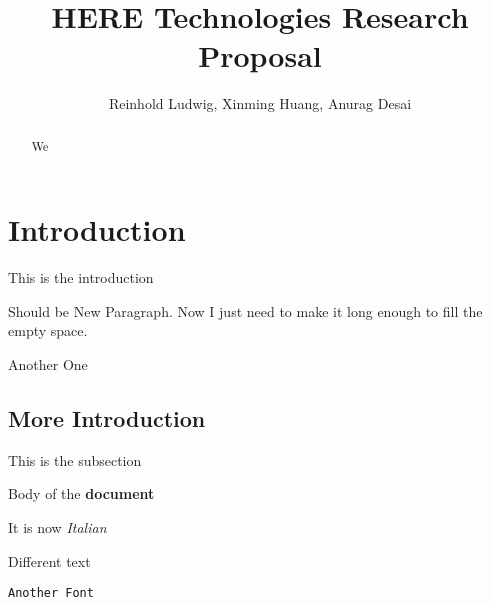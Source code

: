 \documentclass{article}
\begin{document}
	\title{HERE Technologies Research Proposal}
	\author{Reinhold Ludwig, Xinming Huang, Anurag Desai}
	\maketitle
	\begin{abstract}
		We
	\end{abstract}
	\section{Introduction}
	This is the introduction
	
	Should be New Paragraph. Now I just need to make it long enough to fill the empty space.
	
	Another One
	
	\subsection{More Introduction}
	This is the subsection
	
	Body of the \textbf{document}
	
	It is now \textit{Italian}
	
	\textsf{Different text}
	
	\texttt{Another Font}
	
\end{document}
